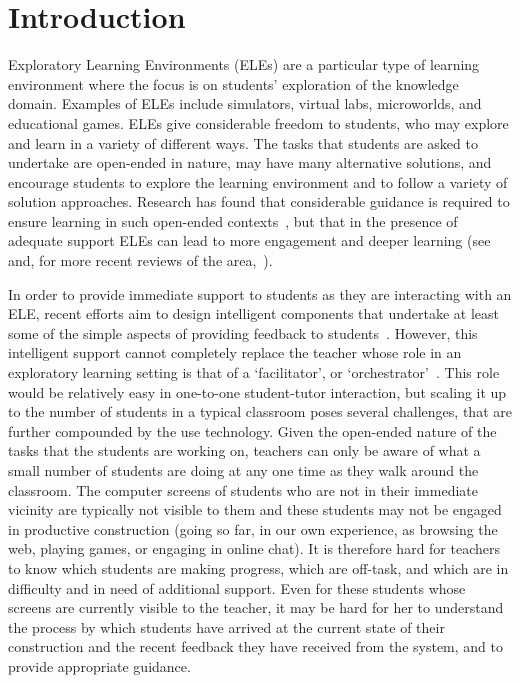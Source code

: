 \section{Introduction}
\label{sec:introduction}

Exploratory Learning Environments (ELEs) are a particular
type of learning environment where the focus is on students'
exploration of the knowledge domain. Examples of ELEs
include simulators, virtual labs, microworlds, and educational
games. ELEs give considerable freedom to students, who may explore and
learn in a variety of different ways.
%
%
The tasks that students are asked to
undertake are open-ended in nature, may have many alternative
solutions, and encourage students to explore the learning
environment and to follow a variety of solution approaches. Research
has found that considerable guidance is required to ensure learning in
such open-ended contexts~\cite{kirschner06,Kynigos92,MayerDiscovery},
but that in the presence of adequate support ELEs can lead to more engagement
and deeper learning (see~\cite{Noss96,JongJoolingen98} and, for more
recent reviews of the area,~\cite{InquiryLearningJoolingen,Healy2010Charting}). 

In order to provide immediate support to students as they are interacting
with an ELE, recent efforts aim to design intelligent components that 
undertake at least some of the simple aspects of providing feedback to 
students~\cite{MiGen-JRPIT,AmersiConati09}. 
However, this intelligent support cannot completely replace the teacher 
whose role in an exploratory learning setting is that 
of a `facilitator', or `orchestrator'~\cite{Trouche2004,Hoyles2004Integration}. 
This role would be relatively easy in one-to-one student-tutor 
interaction, but scaling it up to the number of students in a 
typical classroom poses several challenges,
that are further compounded by the use technology. 
Given the open-ended nature of the tasks that the students are working on,
teachers can only be aware of what a small number of
students are doing at any one time as they walk around the classroom. 
The computer screens of students who are not in their immediate
vicinity are typically not visible to them and these students may not be engaged
in productive construction (going so far, in our own experience, as
browsing the web, playing games, or engaging in online chat). It is
therefore hard for teachers to know which students are making progress,
which are off-task, and which are in difficulty and in need of additional support.
Even for these students whose screens are currently visible to the teacher, 
it may be hard for her to understand the process by which students have
arrived at the current state of their construction and the recent
feedback they have received from the system, and to provide appropriate
guidance. 


